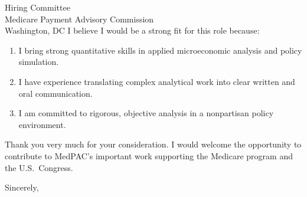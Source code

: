\documentclass[11pt,letterpaper]{letter}
\begin{document}
\begin{letter}{
Hiring Committee \\
Medicare Payment Advisory Commission \\
Washington, DC
}
I believe I would be a strong fit for this role because:
\begin{enumerate}
    \item I bring strong quantitative skills in applied microeconomic analysis and policy simulation.
    \item I have experience translating complex analytical work into clear written and oral communication.
    \item I am committed to rigorous, objective analysis in a nonpartisan policy environment.
\end{enumerate}

Thank you very much for your consideration. I would welcome the opportunity to contribute to MedPAC’s important work supporting the Medicare program and the U.S.\ Congress.

\closing{Sincerely,}

\end{letter}
\end{document}
